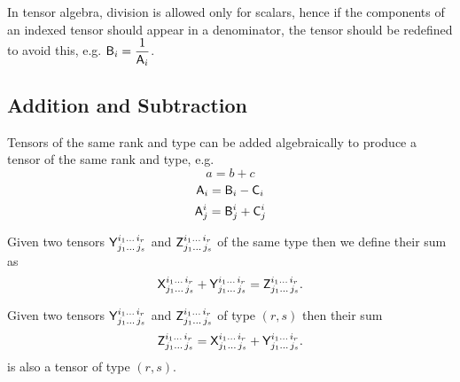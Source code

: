  In tensor algebra, division is allowed only for scalars,
hence if the components of an indexed tensor should appear in a denominator,
the tensor should be redefined to avoid this, e.g. $\mathsf{B}_{i}=\dfrac{1}{\mathsf{A}_{i}}$.


\subsection{Addition and Subtraction}

 Tensors of the same rank and type can be added algebraically to produce a tensor of
the same rank and type, e.g.
\begin{equation}
a=b+c
\end{equation}
\begin{equation}
\mathsf{A}_{i}=\mathsf{B}_{i}-\mathsf{C}_{i}
\end{equation}
\begin{equation}
\mathsf{A}_{j}^{i}=\mathsf{B}_{j}^{i}+\mathsf{C}_{j}^{i}
\end{equation}

\begin{df}
 Given two tensors $\mathsf{Y}^{i_1\ldots\,i_r}_{j_1\ldots\,j_s}$ and $\mathsf{Z}^{i_1\ldots\,i_r}_{j_1\ldots\,j_s}$ of the same type then we define their sum as
 \[\mathsf{X}^{i_1\ldots\,i_r}_{j_1\ldots\,j_s}+
\mathsf{Y}^{i_1\ldots\,i_r}_{j_1\ldots\,j_s}=
\mathsf{Z}^{i_1\ldots\,i_r}_{j_1\ldots\,j_s}.\]
\end{df}



\begin{theorem} \label{sum-tensors} Given two tensors $\mathsf{Y}^{i_1\ldots\,i_r}_{j_1\ldots\,j_s}$ and $\mathsf{Z}^{i_1\ldots\,i_r}_{j_1\ldots\,j_s}$ of type $(r,s)$ then their sum
\[
\mathsf{Z}^{i_1\ldots\,i_r}_{j_1\ldots\,j_s}=
\mathsf{X}^{i_1\ldots\,i_r}_{j_1\ldots\,j_s}+
\mathsf{Y}^{i_1\ldots\,i_r}_{j_1\ldots\,j_s}.
\]
is also a tensor of type $(r,s)$.
\end{theorem}

